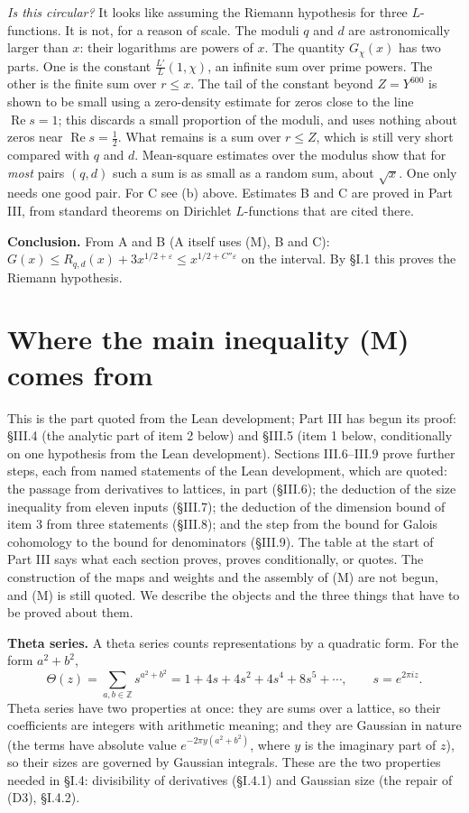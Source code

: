 \documentclass[11pt,letterpaper]{article}
\newcommand{\Z}{\mathbb Z}\newcommand{\Q}{\mathbb Q}\newcommand{\C}{\mathbb C}
\newcommand{\re}{\operatorname{Re}}
\begin{document}
\emph{Is this circular?} It looks like assuming the Riemann hypothesis for three $L$-functions. It is not,
for a reason of scale. The moduli $q$ and $d$ are astronomically larger than $x$: their logarithms are
powers of $x$. The quantity $G_\chi(x)$ has two parts. One is the constant $\frac{L'}L(1,\chi)$, an infinite
sum over prime powers. The other is the finite sum over $r\le x$. The tail of the constant beyond $Z=Y^{600}$ is shown to be small using a zero-density estimate for
zeros close to the line $\re s=1$; this discards a small proportion of the moduli, and uses nothing about
zeros near $\re s=\frac12$. What remains is a sum over $r\le Z$, which is still very short compared
with $q$ and $d$. Mean-square estimates over the modulus show that for \emph{most} pairs $(q,d)$ such a sum
is as small as a random sum, about $\sqrt x$. One only needs one good pair. For C see (b) above. Estimates B and C are proved in Part III,
from standard theorems on Dirichlet $L$-functions that are cited there.

\textbf{Conclusion.} From A and B (A itself uses (M), B and C): $G(x)\le R_{q,d}(x)+3x^{1/2+\varepsilon}\le x^{1/2+C''\varepsilon}$ on
the interval. By \S I.1 this proves the Riemann hypothesis.

\section[Where (M) comes from]{Where the main inequality (M) comes from}

This is the part quoted from the Lean development; Part III has begun its proof: \S III.4 (the analytic part
of item 2 below) and \S III.5 (item 1 below, conditionally on one hypothesis from the Lean development).
Sections III.6--III.9 prove further steps, each from named statements of the Lean development, which are
quoted: the passage from derivatives to lattices, in part (\S III.6); the deduction of the size inequality
from eleven inputs (\S III.7); the deduction of the dimension bound of item 3 from three statements
(\S III.8); and the step from the bound for Galois cohomology to the bound for denominators (\S III.9). The
table at the start of Part III says what each section proves, proves conditionally, or quotes. The
construction of the maps and weights and the assembly of (M) are not begun, and (M) is still quoted. We describe the objects and the three things that have
to be proved about them.

\textbf{Theta series.} A theta series counts representations by a quadratic form. For the form $a^2+b^2$,
\begin{equation}\label{D:31}
 \Theta(z)=\sum_{a,b\in\Z}s^{a^2+b^2}=1+4s+4s^2+4s^4+8s^5+\cdots,\qquad s=e^{2\pi iz}.
\end{equation}
Theta series have two properties at once: they are sums over a
lattice, so their coefficients are integers with arithmetic meaning; and they are Gaussian in nature
(the terms have absolute value $e^{-2\pi y(a^2+b^2)}$, where $y$ is the imaginary part of $z$), so their sizes are governed by Gaussian integrals. These are the two
properties needed in \S I.4: divisibility of derivatives (\S I.4.1) and Gaussian size (the repair of (D3), \S I.4.2).
\end{document}
